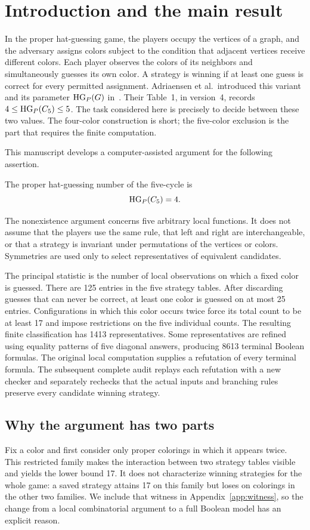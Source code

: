 \section{Introduction and the main result}
In the proper hat-guessing game, the players occupy the vertices of a graph,
and the adversary assigns colors subject to the condition that adjacent
vertices receive different colors. Each player observes the colors of its
neighbors and simultaneously guesses its own color. A strategy is winning
if at least one guess is correct for every permitted assignment.
Adriaensen et al.\ introduced this variant and its parameter
$\operatorname{HG}_{P}(G)$ in~\cite{proper}. Their Table~1, in version~4, records
$4\leq\operatorname{HG}_{P}(C_5)\leq5$.
The task considered here is precisely to decide between these two values.
The four-color construction is short; the five-color exclusion is the
part that requires the finite computation.

This manuscript develops a computer-assisted argument for the following
assertion.
\begin{theorem}\label{thm:main}
The proper hat-guessing number of the five-cycle is
\[
\operatorname{HG}_{P}(C_5)=4.
\]
\end{theorem}

The nonexistence argument concerns five arbitrary local functions. It does
not assume that the players use the same rule, that left and right are
interchangeable, or that a strategy is invariant under permutations of the
vertices or colors. Symmetries are used only to select representatives of
equivalent candidates.

The principal statistic is the number of local observations on which a
fixed color is guessed. There are 125 entries in the five strategy tables.
After discarding guesses that can never be correct, at least one color is
guessed on at most 25 entries. Configurations in which this color occurs
twice force its total count to be at least 17 and impose restrictions on
the five individual counts. The resulting finite classification has
1413 representatives. Some representatives are refined using equality
patterns of five diagonal answers, producing 8613 terminal Boolean
formulas. The original local computation supplies a refutation of every
terminal formula. The subsequent complete audit replays each refutation
with a new checker and separately rechecks that the actual inputs and
branching rules preserve every candidate winning strategy.

\subsection*{Why the argument has two parts}
Fix a color and first consider only proper colorings in which it appears
twice. This restricted family makes the interaction between two strategy
tables visible and yields the lower bound 17. It does not characterize
winning strategies for the whole game: a saved strategy attains 17 on
this family but loses on colorings in the other two families. We include
that witness in Appendix~\ref{app:witness}, so the change from a local
combinatorial argument to a full Boolean model has an explicit reason.

